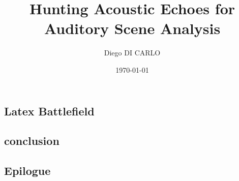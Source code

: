 \documentclass[pdftex,dvipsnames]{dissertation}
\title{Hunting Acoustic Echoes for Auditory Scene Analysis}
\author{Diego DI CARLO}
\date{\today}
\begin{document}
\frontmatter{}


% 



\blankpage{}

\blankpage{}


\cleardoublepage{}

\tableofcontents*{}
\clearpage{}


\vspace{\baselineskip}
\clearpage{}

\listoffigures*{}
\vspace{\baselineskip}
\clearpage{}

\listoftables*{}
\clearpage{}

\mainmatter{}

\begin{fullwidth}
    \part{Latex Battlefield}
\end{fullwidth}
\cleardoublepage{}



\begin{fullwidth}
    \part{conclusion}
\end{fullwidth}


\begin{fullwidth}
    \part{Epilogue}
\end{fullwidth}


\backmatter{}

\begin{fullwidth}
\printbibliography{}
\end{fullwidth}

\cleardoublepage{}


\begin{appendices}

\end{appendices}
\end{document}
